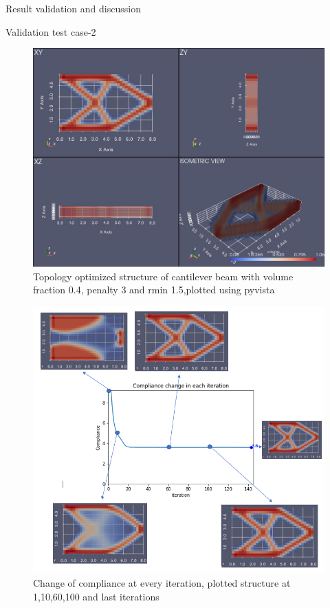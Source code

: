 \documentclass[a4paper,12pt,times]{article}
\begin{document}
\begin{section}{Result validation and discussion}
\begin{subsection}{Validation test case-2}
\begin{figure}[H]
\centering
\includegraphics[width=1\linewidth]{Numerical_result_full_OC_02.jpg}
\centering
\caption{Topology optimized structure of cantilever beam with volume fraction 0.4, penalty 3 and rmin 1.5,plotted using pyvista}
\label{VC-04.3}
\end{figure}
\begin{figure}[H]
\centering
\includegraphics[width=1\linewidth]{Compliance_chg_OC_02.png}
\centering
\caption{Change of compliance at every iteration, plotted structure at 1,10,60,100 and last iterations}
\label{VC-04.4}
\end{figure}

\end{subsection}
\end{section}
\end{document}
